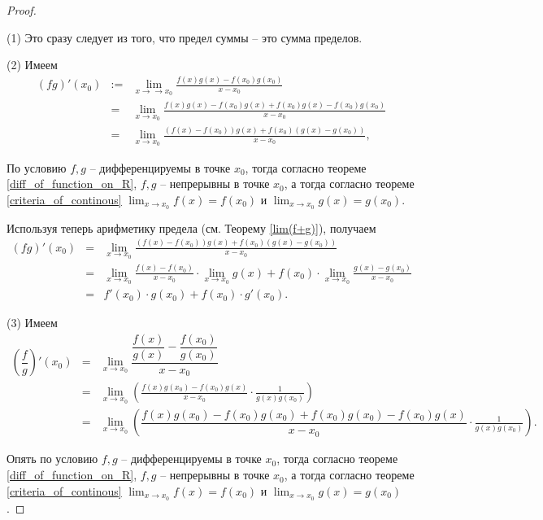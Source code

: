 \begin{proof}~

(1) Это сразу следует из того, что предел суммы -- это сумма пределов.

(2) Имеем
\begin{eqnarray*}
    (fg)'(x_0) &:=& \lim_{x \to \to x_0} \frac{f(x)g(x) - f(x_0)g(x_0)}{x-x_0} \\
    &=& \lim_{x \to x_0} \frac{ f(x)g(x)  - f(x_0) g(x) + f(x_0) g(x) - f(x_0)g(x_0)  }{x-x_0} \\
    &=& \lim_{x \to  x_0} \frac{ (f(x) - f(x_0))g(x)  + f(x_0) ( g(x) - g(x_0) )  }{x-x_0},
\end{eqnarray*}

По условию $f,g$ -- дифференцируемы в точке $x_0$, тогда согласно теореме \ref{diff_of_function_on_R}, $f,g$ -- непрерывны в точке $x_0$, а тогда согласно теореме \ref{criteria_of_continous} $\lim_{x\to x_0} f(x) = f(x_0)$ и $\lim_{x\to x_0}g(x) = g(x_0)$. 

Используя теперь арифметику предела (см. Теорему \ref{lim(f+g)}), получаем
\begin{eqnarray*}
    (fg)'(x_0) &=& \lim_{x \to  x_0} \frac{ (f(x) - f(x_0))g(x)  + f(x_0) ( g(x) - g(x_0) )  }{x-x_0} \\
    &=& \lim_{x \to x_0} \frac{f(x) - f(x_0)}{x-x_0} \cdot \lim_{x \to x_0} g(x) + f(x_0) \cdot \lim_{x \to x_0} \frac{g(x) - g(x_0)}{x-x_0} \\
    &=& f'(x_0)\cdot g(x_0) + f(x_0)\cdot g'(x_0).
\end{eqnarray*}

(3) Имеем
\begin{eqnarray*}
    \left( \dfrac{f}{g} \right)'(x_0) &=& \lim_{x\to x_0} \dfrac{ \dfrac{f(x)}{g(x)} - \dfrac{f(x_0)}{g(x_0)} }{x-x_0} \\
    &=& \lim_{x\to x_0} \left( \frac{f(x) g(x_0) - f(x_0) g(x)}{x-x_0}\cdot \frac{1}{g(x) g(x_0)} \right)\\
    &=& \lim_{x \to x_0}\left( \dfrac{f(x) g(x_0) - f(x_0)g(x_0) + f(x_0)g(x_0) - f(x_0)g(x)}{x-x_0} \cdot \frac{1}{g(x) g(x_0)} \right).
\end{eqnarray*}

Опять по условию $f,g$ -- дифференцируемы в точке $x_0$, тогда согласно теореме \ref{diff_of_function_on_R}, $f,g$ -- непрерывны в точке $x_0$, а тогда согласно теореме \ref{criteria_of_continous} $\lim_{x\to x_0} f(x) = f(x_0)$ и $\lim_{x\to x_0}g(x) = g(x_0)$. 


\end{proof}
